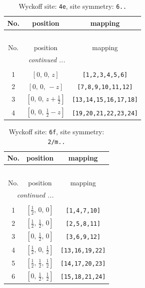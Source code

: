 \documentclass[fleqn,8pt]{jsarticle}
\begin{document}
\renewcommand{\arraystretch}{1.2}
\begin{longtable}{ccc}
\caption{Wyckoff site: {\tt 4e}, site symmetry: {\tt 6..}}
 \\
 \hline \hline
No. & position & mapping \\ \hline \endfirsthead

\multicolumn{2}{l}{\tablename\ \thetable{}} \\
 \hline \hline
No. & position & mapping \\ \hline \endhead

 \hline \hline
\multicolumn{2}{r}{\footnotesize\it continued ...} \\ \endfoot

 \hline \hline
\multicolumn{2}{r}{} \\ \endlastfoot

1 & $\left[ 0,\, 0,\, z \right]$ & {\tt [1,2,3,4,5,6]} \\ \hline
2 & $\left[ 0,\, 0,\, - z \right]$ & {\tt [7,8,9,10,11,12]} \\ \hline
3 & $\left[ 0,\, 0,\, z + \frac{1}{2} \right]$ & {\tt [13,14,15,16,17,18]} \\ \hline
4 & $\left[ 0,\, 0,\, \frac{1}{2} - z \right]$ & {\tt [19,20,21,22,23,24]} \\
\end{longtable}
\renewcommand{\arraystretch}{1.2}
\begin{longtable}{ccc}
\caption{Wyckoff site: {\tt 6f}, site symmetry: {\tt 2/m..}}
 \\
 \hline \hline
No. & position & mapping \\ \hline \endfirsthead

\multicolumn{2}{l}{\tablename\ \thetable{}} \\
 \hline \hline
No. & position & mapping \\ \hline \endhead

 \hline \hline
\multicolumn{2}{r}{\footnotesize\it continued ...} \\ \endfoot

 \hline \hline
\multicolumn{2}{r}{} \\ \endlastfoot

1 & $\left[ \frac{1}{2},\, 0,\, 0 \right]$ & {\tt [1,4,7,10]} \\ \hline
2 & $\left[ \frac{1}{2},\, \frac{1}{2},\, 0 \right]$ & {\tt [2,5,8,11]} \\ \hline
3 & $\left[ 0,\, \frac{1}{2},\, 0 \right]$ & {\tt [3,6,9,12]} \\ \hline
4 & $\left[ \frac{1}{2},\, 0,\, \frac{1}{2} \right]$ & {\tt [13,16,19,22]} \\ \hline
5 & $\left[ \frac{1}{2},\, \frac{1}{2},\, \frac{1}{2} \right]$ & {\tt [14,17,20,23]} \\ \hline
6 & $\left[ 0,\, \frac{1}{2},\, \frac{1}{2} \right]$ & {\tt [15,18,21,24]} \\
\end{longtable}
\end{document}

